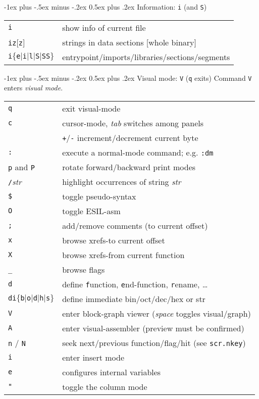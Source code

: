 \documentclass[a4paper,landscape]{article}
\makeatletter
\renewcommand{\section}{\@startsection{section}{1}{0mm}%
                                {-1ex plus -.5ex minus -.2ex}%
                                {0.5ex plus .2ex}%
                                {\normalfont\large\bfseries}}
\makeatother
\begin{document}
\begin{multicols*}{3}
\section{Information: \texttt{i} (and \texttt{S})}
\begin{tabular}{@{}ll@{}}
\texttt{i} & show info of current file \\
\texttt{iz}[\texttt{z}] & strings in data sections [whole binary] \\
\texttt{i}$\{$\texttt{e}$|$\texttt{i}$|$\texttt{l}$|$\texttt{S}$|$\texttt{SS}$\}$ & entrypoint/imports/libraries/sections/segments \\
\end{tabular}

\section{Visual mode: \texttt{V} (\texttt{q} exits)}
Command \texttt{V} enters \emph{visual mode}.

\begin{tabular}{@{}ll@{}}
\texttt{q} & exit visual-mode \\
\texttt{c} & cursor-mode, \textit{tab} switches among panels \\
& \texttt{+}/\texttt{-} increment/decrement current byte \\
\texttt{:} & execute a normal-mode command; e.g. \texttt{:dm} \\
\texttt{p} and \texttt{P} & rotate forward/backward print modes \\
\texttt{/}\textit{str} & highlight occurrences of string \textit{str} \\
\texttt{\$} & toggle pseudo-syntax \\
\texttt{O} & toggle ESIL-asm \\
\texttt{;} & add/remove comments (to current offset) \\
\texttt{x} & browse xrefs-to current offset \\
\texttt{X} & browse xrefs-from current function \\
\texttt{\_} & browse flags \\
\texttt{d} & define \texttt{f}unction, \texttt{e}nd-function, \texttt{r}ename, \ldots \\
\texttt{di}$\{$\texttt{b}$|$\texttt{o}$|$\texttt{d}$|$\texttt{h}$|$\texttt{s}$\}$ & define immediate bin/oct/dec/hex or str \\
\texttt{V} & enter block-graph viewer (\emph{space} toggles visual/graph)\\
\texttt{A} & enter visual-assembler (preview must be confirmed)\\
\texttt{n} / \texttt{N} & seek next/previous function/flag/hit (see \texttt{scr.nkey}) \\
\texttt{i} & enter insert mode \\
\texttt{e} & configures internal variables \\
\texttt{"} & toggle the column mode \\
\end{tabular}

\end{multicols*}
\end{document}
